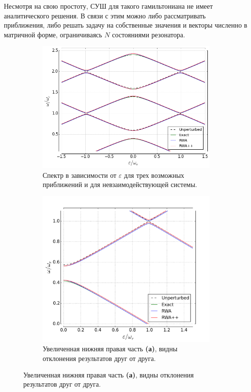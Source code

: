 \documentclass[12pt, twoside]{report}
\numberwithin{equation}{section}
\numberwithin{figure}{section}
\begin{document}
Несмотря на свою простоту, СУШ для такого гамильтониана не имеет аналитического решения\cite{braak2011}. В связи с этим можно либо рассматривать приближения, либо решать задачу на собственные значения и векторы численно в матричной форме, ограничиваясь $N$ состояниями резонатора.

\begin{figure}

\begingroup
\captionsetup[subfigure]{justification=normal, width=0.8\textwidth}
\centering
\begin{subfigure}[t]{0.54\textwidth}
\centering
\includegraphics[scale=0.35]{Pictures/rabi_spectrum}
\caption{Спектр в зависимости от $\varepsilon$ для трех возможных приближений и для невзаимодействующей системы.}
\end{subfigure}
\begin{subfigure}[t]{0.44\textwidth}
\centering
\includegraphics[scale=0.35]{Pictures/rabi_spectrum_closeup}
\caption{Увеличенная нижняя правая часть \textbf{(а)}, видны отклонения результатов друг от друга.}
\end{subfigure}


\end{figure}
\end{document}
